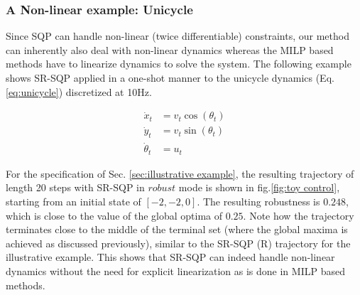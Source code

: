 \subsubsection{A Non-linear example: Unicycle}
\label{sec:nl_unicycle}
Since SQP can handle non-linear (twice differentiable) constraints, our method can inherently also deal with non-linear dynamics whereas the MILP based methods have to linearize dynamics to solve the system. The following example shows SR-SQP applied in a one-shot manner to the unicycle dynamics (Eq. \ref{eq:unicycle}) discretized at 10Hz.

\begin{subequations}
\label{eq:unicycle}
\begin{align}
\dot{x}_t &=v_t \cos (\theta_t) \nonumber \\ 
\dot{y}_t &=v_t \sin (\theta_t) \nonumber \\
\dot{\theta}_t &= u_t
\end{align}
\end{subequations}

For the specification of Sec. \ref{sec:illustrative example}, the resulting trajectory of length 20 steps with SR-SQP in $\textit{robust}$ mode is shown in fig.\ref{fig:toy control}, starting from an initial state of $[-2,-2,0]$. The resulting robustness is $0.248$, which is close to the value of the global optima of $0.25$. Note how the trajectory terminates close to the middle of the terminal set (where the global maxima is achieved as discussed previously), similar to the SR-SQP (R) trajectory for the illustrative example. This shows that SR-SQP can indeed handle non-linear dynamics without the need for explicit linearization as is done in MILP based methods.
